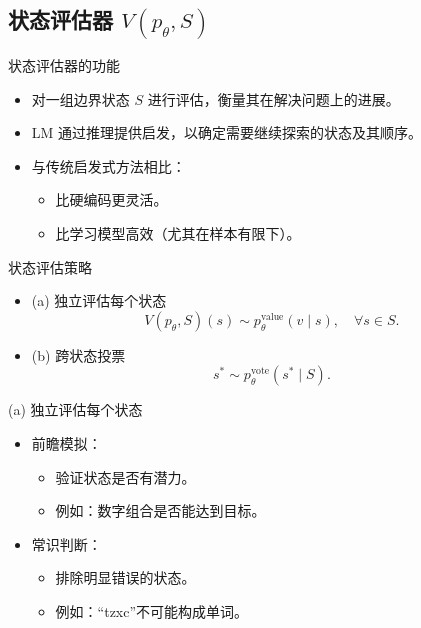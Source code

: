 
\subsection{状态评估器 $V(p_\theta, S)$}

\begin{frame}{状态评估器的功能}
\begin{itemize}
    \item 对一组边界状态 $S$ 进行评估，衡量其在解决问题上的进展。
	\bigskip
    \item LM 通过推理提供启发，以确定需要继续探索的状态及其顺序。
	\bigskip
    \item 与传统启发式方法相比：
    \begin{itemize}
        \item 比硬编码更灵活。
        \item 比学习模型高效（尤其在样本有限下）。
    \end{itemize}
\end{itemize}
\end{frame}

\begin{frame}{状态评估策略}
\begin{itemize}
    \item (a) 独立评估每个状态
    \[
    V(p_\theta, S)(s) \sim p_\theta^{\text{value}}(v \mid s), \quad \forall s \in S.
    \]
	
	\pause
    \item (b) 跨状态投票
    \[
    s^* \sim p_\theta^{\text{vote}}(s^* \mid S).
    \]
\end{itemize}
\end{frame}

\begin{frame}{(a) 独立评估每个状态}
\begin{itemize}
    \item 前瞻模拟：
    \begin{itemize}
        \item 验证状态是否有潜力。
        \item 例如：数字组合是否能达到目标。
	
	\pause
    \end{itemize}

    \bigskip
    \item 常识判断：
    \begin{itemize}
        \item 排除明显错误的状态。
        \item 例如：“tzxc”不可能构成单词。
    \end{itemize}
\end{itemize}
\end{frame}

